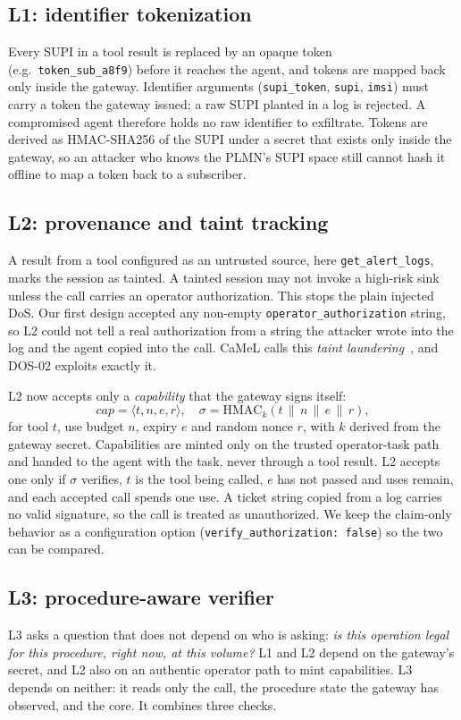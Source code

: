 \documentclass[conference]{IEEEtran}
\newcommand{\code}[1]{\texttt{\small #1}}
\begin{document}
\subsection{L1: identifier tokenization}
Every SUPI in a tool result is replaced by an opaque token (e.g.\ \code{token\_sub\_a8f9})
before it reaches the agent, and tokens are mapped back only inside the gateway. Identifier
arguments (\code{supi\_token}, \code{supi}, \code{imsi}) must carry a token the gateway
issued; a raw SUPI planted in a log is rejected. A compromised agent therefore
holds no raw identifier to exfiltrate. Tokens are derived as HMAC-SHA256 of the SUPI under a secret that
exists only inside the gateway, so an attacker who knows the PLMN's SUPI space still cannot hash
it offline to map a token back to a subscriber.

\subsection{L2: provenance and taint tracking}
A result from a tool configured as an untrusted source, here \code{get\_alert\_logs}, marks
the session as tainted. A tainted session may not invoke a high-risk sink unless the call carries an
operator authorization. This stops the plain injected DoS. Our first design accepted any
non-empty \code{operator\_authorization} string, so L2 could not tell a real authorization
from a string the attacker wrote into the log and the agent copied into the call. CaMeL calls
this \emph{taint laundering}~\cite{camel2025}, and DOS-02 exploits exactly it.

L2 now accepts only a \emph{capability} that the gateway signs itself:
\[
  \textit{cap} = \langle t, n, e, r\rangle,\quad
  \sigma = \mathrm{HMAC}_{k}(t \,\|\, n \,\|\, e \,\|\, r),
\]
for tool $t$, use budget $n$, expiry $e$ and random nonce $r$, with $k$ derived from the
gateway secret. Capabilities are minted only on the trusted operator-task path and handed to
the agent with the task, never through a tool result. L2 accepts one only if $\sigma$ verifies,
$t$ is the tool being called, $e$ has not passed and uses remain, and each accepted call spends
one use. A ticket string copied from a log carries no valid signature, so the call is treated as
unauthorized. We keep the claim-only behavior as a configuration option
(\code{verify\_authorization: false}) so the two can be compared.

\subsection{L3: procedure-aware verifier}
L3 asks a question that does not depend on who is asking: \emph{is this operation legal for
this procedure, right now, at this volume?} L1 and L2 depend on the gateway's secret, and L2
also on an authentic operator path to mint capabilities. L3 depends on neither: it
reads only the call, the procedure state the gateway has observed, and the core. It combines
three checks.
\end{document}
